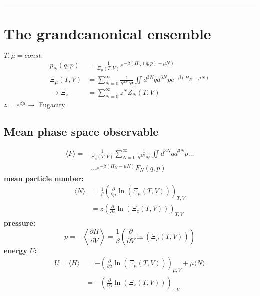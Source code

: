 \noindent\rule[1ex]{\textwidth/5}{1pt}
\section{The grandcanonical ensemble}

$T,\mu = const.$
\begin{equation*}
    \begin{aligned}
        p_N(q,p) &= \frac{1}{\Xi_\mu(T,V)} e^{-\beta (H_N(q,p) - \mu N)} \\
        \Xi_{\mu}(T,V) &= \sum_{N=0}^\infty \frac{1}{h^{3N}N!} \iint d^{3N} q d^{3N} p e^{-\beta (H_N - \mu N)} \\
        \rightarrow \Xi_z&= \sum_{N=0}^\infty z^N Z_N(T,V)
    \end{aligned}
\end{equation*}
$z = e^{\beta \mu} \rightarrow $ Fugacity 


\subsection*{Mean phase space observable}

\begin{equation*}
    \begin{aligned}
        \langle F \rangle = &\frac{1}{\Xi_\mu(T,V)} \sum_{N=0}^\infty \frac{1}{h^{3N}N!} \iint d^{3N} q d^{3N} p  \dots \\
         &\dots e^{-\beta (H_N - \mu N)} F_N (q,p)
    \end{aligned}
\end{equation*}
\textbf{mean particle number:}
\begin{equation*}
    \begin{aligned}
        \langle N \rangle &= \frac{1}{\beta} \left( \frac{\partial}{\partial \mu} \ln \left(\Xi_\mu ( T,V)\right)\right)_{T,V} \\
            &= z \left(\frac{\partial}{\partial z} \ln \left(\Xi_z(T,V)\right)\right)_{T,V}
    \end{aligned}
\end{equation*}
\textbf{pressure:}
\begin{equation*}
    p = - \left\langle \frac{\partial H}{\partial V} \right\rangle = \frac{1}{\beta} \left( \frac{\partial}{\partial V} \ln \left(\Xi_\mu ( T,V)\right)\right)
\end{equation*}
\textbf{energy $U$:}
\begin{equation*}
    \begin{aligned}
        U = \langle H \rangle &= - \left( \frac{\partial}{\partial \beta} \ln \left(\Xi_\mu ( T,V)\right)\right)_{\mu,V} + \mu \langle N \rangle \\
            &= - \left( \frac{\partial}{\partial \beta} \ln \left(\Xi_z ( T,V)\right)\right)_{z,V}
    \end{aligned}
\end{equation*}

